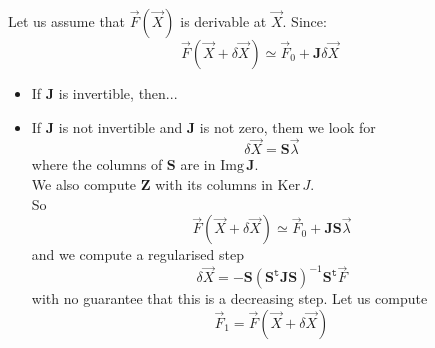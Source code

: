 \documentclass[aps,12pt]{revtex4}
\newcommand{\trn}[1]{{#1}^{\mathtt{t}}}
\begin{document}
Let us assume that $\vec{F}(\vec{X})$ is derivable at $\vec{X}$.
Since:
\begin{equation}
	\vec{F}(\vec{X}+\delta\vec{X}) \simeq \vec{F}_0 + \bm{J} \delta\vec{X}
\end{equation}

\begin{itemize}
\item If $\bm{J}$ is invertible, then...
\item If $\bm{J}$ is not invertible and $\bm{J}$ is not zero, them we look for
$$
	\delta\vec{X} = \bm{S} \vec{\lambda}
$$
where the columns of $\bm{S}$ are in $\mathrm{Img\,} \bm{J}$.\\
We also compute $\bm{Z}$ with its   columns   in $\mathrm{Ker\,} J$.\\
So
$$
	\vec{F}(\vec{X}+\delta\vec{X}) \simeq \vec{F}_0 + \bm{J} \bm{S} \vec{\lambda}
$$
and we compute a regularised step
$$
	\delta\vec{X} = -\bm{S}\left(\trn{\bm{S}}\bm{J}\bm{S}\right)^{-1}\trn{\bm{S}}\vec{F} 
$$
with no guarantee that this is a decreasing step.
Let us compute $$\vec{F}_1=\vec{F}(\vec{X}+\delta\vec{X})$$
\end{itemize}




%
%
\end{document}
